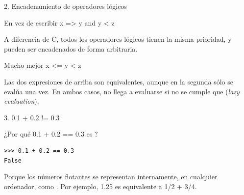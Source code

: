 \documentclass[14pt]{beamer}
\begin{document}
\begin{frame}{2. Encadenamiento de operadores lógicos}
  \begin{alertblock}{En vez de escribir}
    \centering \LARGE x => y and y < z
  \end{alertblock}

  \small
  \begin{center}
    A diferencia de C, todos los operadores lógicos tienen la misma
    prioridad, y pueden ser encadenados de forma arbitraria.
  \end{center}

  \begin{block}{Mucho mejor}
    \centering \LARGE x <= y < z
  \end{block}

  \small
  \begin{center}
    Las dos expresiones de arriba son equivalentes, aunque en la
    segunda  sólo se evalúa una vez. En ambos casos,
     no llega a evaluarse si no se cumple que
     (\emph{lazy evaluation}).
  \end{center}
\end{frame}

\begin{frame}[fragile]{3. 0.1 + 0.2 != 0.3}
  \begin{alertblock}{}
    \centering \Large ¿Por qué 0.1 + 0.2 == 0.3 es ?
  \end{alertblock}

  \begin{exampleblock}{}
    \begin{lstlisting}
>>> 0.1 + 0.2 == 0.3
False
    \end{lstlisting}
  \end{exampleblock}

  \begin{center}
    Porque los números flotantes se representan internamente, en
    cualquier ordenador, como . Por
    ejemplo, 1.25 es equivalente a 1/2 + 3/4.
  \end{center}
\end{frame}
\end{document}
